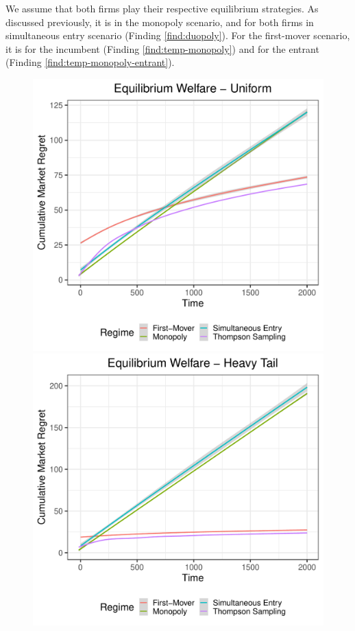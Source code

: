 \documentclass[../competing_bandits_with_appendix.tex]{subfiles}
\begin{document}
We assume that both firms play their respective equilibrium strategies.
As discussed previously, it is
\DynamicGreedy in the monopoly scenario, and
\DynamicGreedy for both firms in simultaneous entry scenario (Finding \ref{find:duopoly}).
For the first-mover scenario, it is \Thompson for the incumbent (Finding \ref{find:temp-monopoly}) and \DynamicGreedy for the entrant (Finding \ref{find:temp-monopoly-entrant}).

\begin{figure}[bth]
\centering
\includegraphics[scale=0.35]{ec19paper/figures/unif_eq_welfare}
\includegraphics[scale=0.35]{ec19paper/figures/ht_eq_welfare}

\end{figure}
\end{document}

